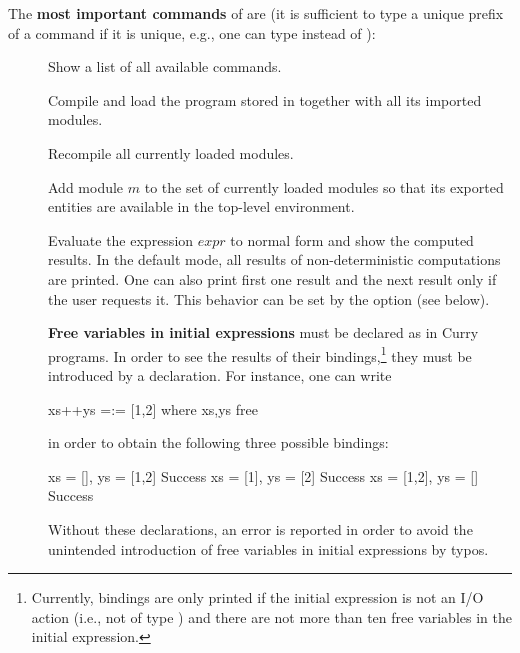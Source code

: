 The {\bf most important commands} of \CYS are
(it is sufficient to type a unique prefix of a command if it is unique,
e.g., one can type  instead of ):

\begin{description}
\item[]
Show a list of all available commands.

\item[]
Compile and load the program stored in 
together with all its imported modules.

\item[]
Recompile all currently loaded modules.

\item[]
Add module $m$ to the set of currently loaded modules
so that its exported entities are available in the top-level environment.

\item[] Evaluate the expression $expr$ to normal form
and show the computed results.
In the default mode, all results of
non-deterministic computations are printed.
One can also print first one result and the next result
only if the user requests it. This behavior can be set by
the option  (see below).

\textbf{Free variables in initial expressions} must be declared as
in Curry programs.
In order to see the results of their bindings,\footnote{Currently,
bindings are only printed if the initial expression is not an I/O action
(i.e., not of type )
and there are not more than ten free variables
in the initial expression.}
they must be introduced by a  declaration.
For instance, one can write
\begin{curry}
xs++ys =:= [1,2]  where xs,ys free
\end{curry}
in order to obtain the following three possible bindings:
\begin{curry}
{xs = [], ys = [1,2]} Success
{xs = [1], ys = [2]} Success
{xs = [1,2], ys = []} Success
\end{curry}
Without these declarations, an error is reported in order to
avoid the unintended introduction of free variables in initial expressions
by typos.


\end{description}
